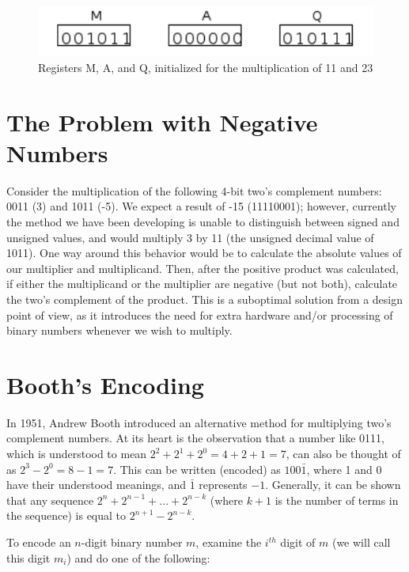 \documentclass{article}
\begin{document}
\begin{figure}[h]
\centering
\includegraphics{init.pdf}
\caption{Registers M, A, and Q, initialized for the multiplication of 11 and 23}
\end{figure}%

\pagebreak

\section{The Problem with Negative Numbers}
Consider the multiplication of the following 4-bit two's complement numbers: 0011 (3) and 1011 (-5).
We expect a result of -15 (11110001); however, currently the method we have been developing is unable to distinguish between signed and unsigned values, and would multiply 3 by 11 (the unsigned decimal value of 1011).
One way around this behavior would be to calculate the absolute values of our multiplier and multiplicand.
Then, after the positive product was calculated, if either the multiplicand or the multiplier are negative (but not both), calculate the two's complement of the product.
This is a suboptimal solution from a design point of view, as it introduces the need for extra hardware and/or processing of binary numbers whenever we wish to multiply.

\section{Booth's Encoding}
In 1951, Andrew Booth introduced an alternative method for multiplying two's complement numbers.
At its heart is the observation that a number like 0111, which is understood to mean $2^2 + 2^1 + 2^0 = 4 + 2 + 1 = 7$, can also be thought of as $2^3 - 2^0 = 8 - 1 = 7$.
This can be written (encoded) as $100\bar{1}$, where 1 and 0 have their understood meanings, and $\bar{1}$ represents $-1$.
Generally, it can be shown that any sequence $2^n + 2^{n-1} + ... + 2^{n-k}$ (where $k+1$ is the number of terms in the sequence) is equal to $2^{n+1} - 2^{n-k}$.

To encode an $n$-digit binary number $m$, examine the $i^{th}$ digit of $m$ (we will call this digit $m_i$) and do one of the following: %
\end{document}
